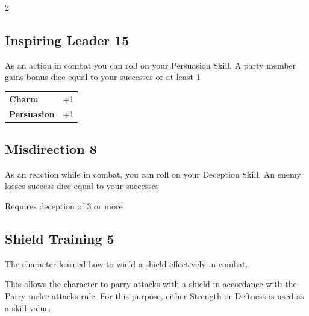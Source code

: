 \begin{multicols}{2}
\begin{tcolorbox}
    \subsection*{Inspiring Leader \hfill \small{15 }}
    \tcblower
As an action in combat you can roll on your Persuasion Skill. A party member gains bonus dice equal to your successes or at least 1


\vspace{3mm}

\begin{tabular}{@{}ll@{}}
    \textbf{Charm} & +1\\
    \textbf{Persuasion} & +1\\
\end{tabular}


\end{tcolorbox}

\begin{tcolorbox}
    \subsection*{Misdirection \hfill \small{8 }}
    \tcblower
As an reaction while in combat, you can roll on your Deception Skill. An enemy losses success dice equal to your successes

Requires deception of 3 or more


\vspace{3mm}



\end{tcolorbox}

\begin{tcolorbox}
    \subsection*{Shield Training \hfill \small{5 }}
    \tcblower
The character learned how to wield a shield effectively in combat.

This allows the character to parry attacks with a shield in accordance with the Parry melee attacks rule. For this purpose, either Strength or Deftness is used as a skill value.



\end{tcolorbox}
\end{multicols}
